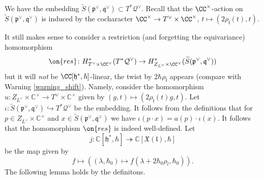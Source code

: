 \documentclass[12pt]{amsart}
\begin{document}
We have the embedding $\widetilde{S}(\mathfrak{p}^\vee,\mathfrak{q}^\vee) \subset T^*\mathcal{Q}^\vee$.
Recall that the $\CC^\times$-action on $\widetilde{S}(\mathfrak{p}^\vee,\mathfrak{q}^\vee)$ is induced by the cocharacter $\CC^\times \rightarrow T^\vee \times \CC^\times$, $t \mapsto (2\rho_{\mathfrak{l}}(t),t)$. 



It still makes sense to consider a restriction (and forgetting the equivariance) homomorphism 
\begin{equation*}
\on{res}\colon H^*_{T^\vee \times \CC^\times}(T^*\mathcal{Q}^\vee) \rightarrow H^*_{Z_{L^\vee} \times \CC^\times}(\widetilde{S}(\mathfrak{p}^\vee,\mathfrak{q}^\vee))\end{equation*} 
but it will {\emph{not}} be $\CC[\mathfrak{h}^*,\hbar]$-linear, the twist by $2\hbar\rho_{\mathfrak{l}}$ appears (compare with Warning \ref{warning_shift}).
Namely, consider the homomorphism $u\colon Z_{L^\vee} \times \mathbb{C}^\times \rightarrow T^\vee \times \mathbb{C}^\times$ given by $(g,t) \mapsto (2\rho_{\mathfrak{l}}(t)g,t)$. Let $\iota\colon \widetilde{S}(\mathfrak{p}^\vee,\mathfrak{q}^\vee) \hookrightarrow T^*\mathcal{Q}^\vee$ be the embedding. 
It follows from the definitions that  for $p \in Z_{L^\vee} \times \mathbb{C}^\times$ and $x \in \widetilde{S}(\mathfrak{p}^\vee,\mathfrak{q}^\vee) $ we have $\iota(p \cdot x)=a(p) \cdot \iota(x)$. It follows that the homomorphism $\on{res}$ is indeed well-defined.   
Let 
\begin{equation*}
j\colon \mathbb{C}[\mathfrak{h}^*,\hbar] \twoheadrightarrow  \mathbb{C}[\mathfrak{X}(\mathfrak{l}),\hbar]
\end{equation*}
be the map given by 
\begin{equation*}
f \mapsto ((\lambda,\hbar_0) \mapsto f(\lambda+2\hbar_0\rho_l,\hbar_0)).
\end{equation*}
The following lemma holds by the definitons.
\end{document}
